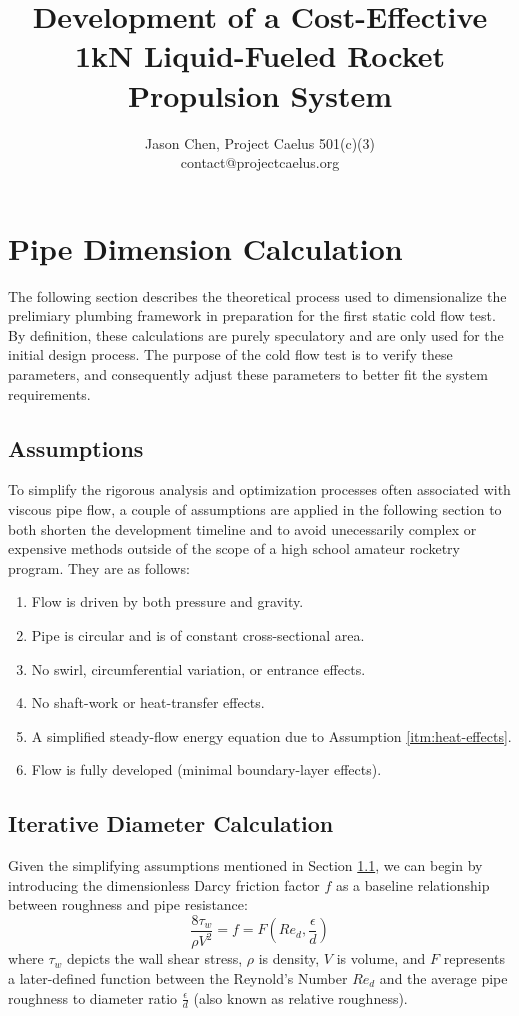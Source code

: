 \documentclass[11pt]{article} %
\title{Development of a Cost-Effective 1kN Liquid-Fueled Rocket Propulsion System}
\author{%
	Jason Chen, Project Caelus 501(c)(3)  \\
	\large contact@projectcaelus.org}
\numberwithin{equation}{section} %
\begin{document}
\maketitle

\section{Pipe Dimension Calculation}

The following section describes the theoretical process used to dimensionalize the prelimiary plumbing framework in preparation for the first static cold flow test. By definition, these calculations are purely speculatory and are only used for the initial design process. The purpose of the cold flow test is to verify these parameters, and consequently adjust these parameters to better fit the system requirements.

\subsection{Assumptions} \label{sec:assumptions}

To simplify the rigorous analysis and optimization processes often associated with viscous pipe flow, a couple of assumptions are applied in the following section to both shorten the development timeline and to avoid unecessarily complex or expensive methods outside of the scope of a high school amateur rocketry program. They are as follows:
\begin{enumerate}
\item Flow is driven by both pressure and gravity.
\item Pipe is circular and is of constant cross-sectional area.
\item No swirl, circumferential variation, or entrance effects.
\item No shaft-work or heat-transfer effects. \label{itm:heat-effects}
\item A simplified steady-flow energy equation due to Assumption \ref{itm:heat-effects}.
\item Flow is fully developed (minimal boundary-layer effects).

\end{enumerate}


\subsection{Iterative Diameter Calculation}


Given the simplifying assumptions mentioned in Section \ref{sec:assumptions}, we can begin by introducing the dimensionless Darcy friction factor $f$ as a baseline relationship between roughness and pipe resistance:
\begin{equation} \label{eq:darcy-friction}
\frac{8 \tau_{w}}{\rho V^{2}} = f = F(Re_{d}, \frac{\epsilon}{d})
\end{equation}
where $\tau_{w}$ depicts the wall shear stress, $\rho$ is density, $V$ is volume, and $F$ represents a later-defined function between the Reynold's Number $Re_{d}$ and the average pipe roughness to diameter ratio $\frac{\epsilon}{d}$ (also known as relative roughness).
\end{document}
